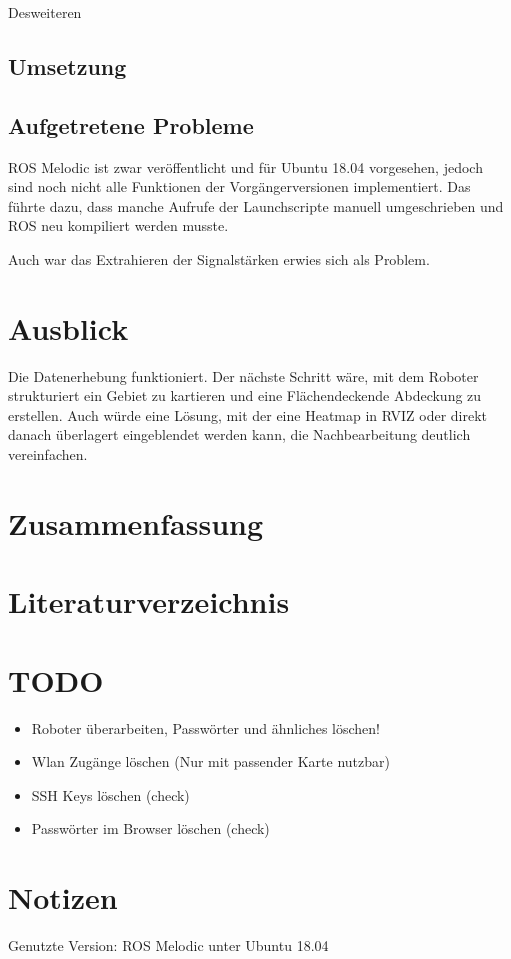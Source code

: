 \documentclass{scrartcl}%
\begin{document}
Desweiteren 
\subsection{Umsetzung}
\subsection{Aufgetretene Probleme}
ROS Melodic ist zwar veröffentlicht und für Ubuntu 18.04 vorgesehen, jedoch sind noch nicht alle Funktionen der Vorgängerversionen implementiert. Das führte dazu, dass manche Aufrufe der Launchscripte manuell umgeschrieben und ROS neu kompiliert werden musste.

Auch war das Extrahieren der Signalstärken erwies sich als Problem.
\section{Ausblick}
Die Datenerhebung funktioniert. Der nächste Schritt wäre, mit dem Roboter strukturiert ein Gebiet zu kartieren und eine Flächendeckende Abdeckung zu erstellen. Auch würde eine Lösung, mit der eine Heatmap in RVIZ oder direkt danach überlagert eingeblendet werden kann, die Nachbearbeitung deutlich vereinfachen.

\section{Zusammenfassung}

\section{Literaturverzeichnis}







\section{TODO}
\begin{itemize}
	\item Roboter überarbeiten, Passwörter und ähnliches löschen!
	\item Wlan Zugänge löschen (Nur mit passender Karte nutzbar)
	\item SSH Keys löschen (check)
	\item Passwörter im Browser löschen (check)
\end{itemize}
\section{Notizen}
Genutzte Version: ROS Melodic unter Ubuntu 18.04
\end{document}
